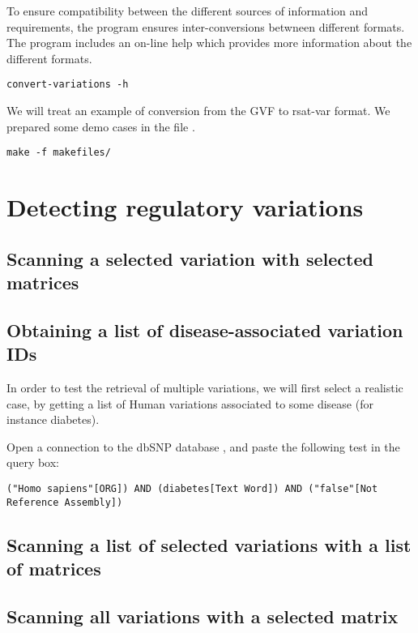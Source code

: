 To ensure compatibility between the different sources of information
and \RSAT requirements, the program 
ensures inter-conversions betwneen different formats. The program
includes an on-line help which provides more information about the
different formats.

\begin{lstlisting}
convert-variations -h
\end{lstlisting}


We will treat an example of conversion from the GVF to rsat-var
format. We prepared some demo cases in the file
.

\begin{lstlisting}
make -f makefiles/
\end{lstlisting}
\tbw

\section{Detecting regulatory variations}

\subsection{Scanning a selected variation with selected matrices}

\tbw

\subsection{Obtaining a list of disease-associated variation IDs}

In order to test the retrieval of multiple variations, we will first
select a realistic case, by getting a list of Human variations
associated to some disease (for instance diabetes).

Open a connection to the dbSNP database
, and paste the following
test in the query box:

\begin{lstlisting}
("Homo sapiens"[ORG]) AND (diabetes[Text Word]) AND ("false"[Not Reference Assembly])
\end{lstlisting}

\tbw


\subsection{Scanning a list of selected variations with a list of matrices}

\tbw

\subsection{Scanning all variations with a selected matrix}

\tbw



